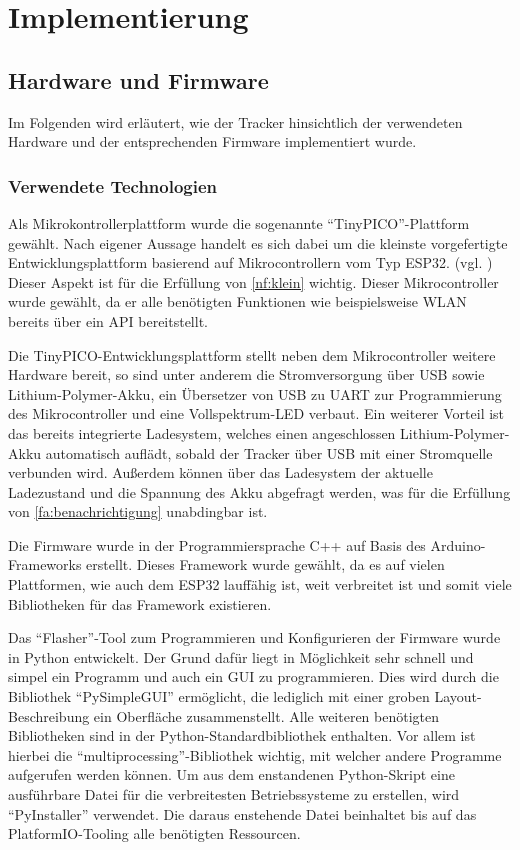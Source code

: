 \chapter{Implementierung} \label{chap:implementierung}

\section{Hardware und Firmware}

Im Folgenden wird erläutert, wie der Tracker hinsichtlich der verwendeten Hardware und der
entsprechenden Firmware implementiert wurde.

\subsection{Verwendete Technologien}\label{sec:hardware-used-technologies}

Als Mikrokontrollerplattform wurde die sogenannte \enquote{TinyPICO}-Plattform gewählt. Nach eigener
Aussage handelt es sich dabei um die kleinste vorgefertigte Entwicklungsplattform basierend auf
Mikrocontrollern vom Typ ESP32. (vgl. \cite{tinypico2020}) Dieser Aspekt ist für die Erfüllung von \ref{nf:klein} wichtig.
Dieser Mikrocontroller wurde gewählt, da er alle benötigten Funktionen wie beispielsweise \gls{WLAN}
bereits über ein \gls{API} bereitstellt.

Die TinyPICO-Entwicklungsplattform stellt neben dem Mikrocontroller weitere Hardware bereit, so sind
unter anderem
die Stromversorgung über \gls{USB} sowie Lithium-Polymer-\gls{Akku}, ein Übersetzer von \gls{USB}
zu \gls{UART} zur Programmierung des Mikrocontroller und eine Vollspektrum-\gls{LED} verbaut.
Ein weiterer Vorteil ist das bereits integrierte Ladesystem, welches einen angeschlossen
Lithium-Polymer-\gls{Akku} automatisch auflädt, sobald der Tracker über \gls{USB} mit einer
Stromquelle verbunden wird. Außerdem können über das Ladesystem der aktuelle Ladezustand und die
Spannung des \gls{Akku} abgefragt werden, was für die Erfüllung von \ref{fa:benachrichtigung}
unabdingbar ist.

Die Firmware wurde in der Programmiersprache C++ auf Basis des Arduino-Frameworks erstellt. Dieses
Framework wurde gewählt, da es auf vielen Plattformen, wie auch dem ESP32 lauffähig ist, weit
verbreitet ist und somit viele Bibliotheken für das Framework existieren.

Das \enquote{Flasher}-Tool zum Programmieren und Konfigurieren der Firmware wurde in Python
entwickelt.
Der Grund dafür liegt in Möglichkeit sehr schnell und simpel ein Programm und auch ein \gls{GUI} zu
programmieren.
Dies wird durch die Bibliothek \enquote{PySimpleGUI} ermöglicht, die lediglich mit einer groben Layout-Beschreibung
ein Oberfläche zusammenstellt.
Alle weiteren benötigten Bibliotheken sind in der Python-Standardbibliothek enthalten.
Vor allem ist hierbei die \enquote{multiprocessing}-Bibliothek wichtig, mit welcher andere Programme aufgerufen werden können.
Um aus dem enstandenen Python-Skript eine ausführbare Datei für die verbreitesten Betriebssysteme zu erstellen, wird \enquote{PyInstaller} verwendet.
Die daraus enstehende Datei beinhaltet bis auf das PlatformIO-Tooling alle benötigten Ressourcen. 

